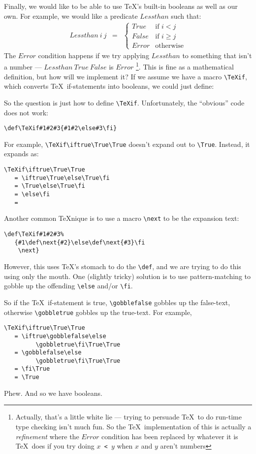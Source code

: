 Finally, we would like to be able to use \TeX's built-in booleans
as well as our own.  For example, we would like a predicate
$Lessthan$ such that:
\begin{eqnarray*}
   Lessthan~i~j  &  
   =  &
   \left\{
      \begin{array}{ll}
         True   &  \mbox{if } i < j    \\
         False  &  \mbox{if } i \ge j  \\
         Error  &  \mbox{otherwise}  
      \end{array}
   \right.
\end{eqnarray*}
The $Error$ condition happens if we try applying $Lessthan$ to something
that isn't a number --- $Lessthan~True~False$ is $Error$%
\footnote
   {Actually, that's a little white lie --- trying to persuade \TeX\ to
    do run-time type checking isn't much fun.  So the \TeX\ implementation
    of this is actually a {\em refinement\/} where the $Error$ condition
    has been replaced by whatever it is \TeX\ does if you try doing
    {\tt\string\ifnum $x$ < $y$} when $x$ and $y$ aren't numbers}.
This is fine as a mathematical definition, but how will
we implement it?  If we assume we have a macro \verb|\TeXif|,
which converts \TeX\ if-statements into booleans, we could just
define:
\begin{TeXcode}
\def\Lessthan#1#2{\TeXif{\ifnum#1<#2 }}
\end{TeXcode}
So the question is just how to define \verb|\TeXif|.
Unfortunately, the ``obvious'' code does not work:
\begin{verbatim}
\def\TeXif#1#2#3{#1#2\else#3\fi}
\end{verbatim}
For example, \verb|\TeXif\iftrue\True\True| doesn't expand out to
\verb|\True|.  Instead, it expands as:
\begin{verbatim}
\TeXif\iftrue\True\True
   = \iftrue\True\else\True\fi
   = \True\else\True\fi
   = \else\fi
   =
\end{verbatim}
Another common \TeX nique is to use a macro \verb|\next| to
be the expansion text:
\begin{verbatim}
\def\TeXif#1#2#3%
   {#1\def\next{#2}\else\def\next{#3}\fi
    \next}
\end{verbatim}
However, this uses \TeX's stomach to do the \verb|\def|, and we are
trying to do this using only the mouth.  One (slightly tricky) solution
is to use pattern-matching to gobble up the offending \verb|\else| and/or
\verb|\fi|.
So if the \TeX\ if-statement is true, \verb|\gobblefalse| gobbles
up the false-text, otherwise \verb|\gobbletrue| gobbles up the 
true-text.  For example,
\begin{verbatim}
\TeXif\iftrue\True\True
   = \iftrue\gobblefalse\else
         \gobbletrue\fi\True\True
   = \gobblefalse\else
         \gobbletrue\fi\True\True
   = \fi\True
   = \True
\end{verbatim}
Phew.  And so we have booleans.

